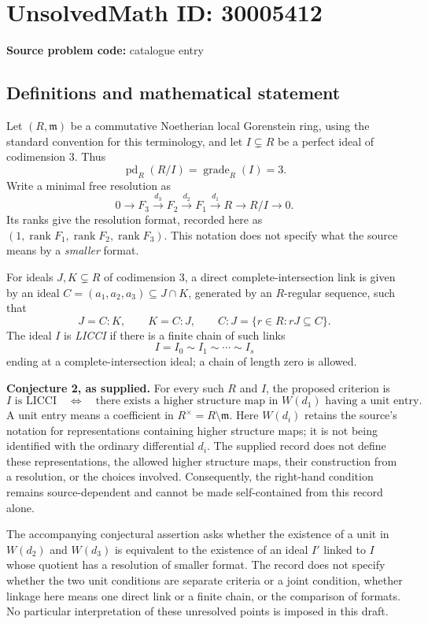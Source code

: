 \documentclass[11pt]{article}
\begin{document}
\section*{UnsolvedMath ID: 30005412}
\textbf{Source problem code:} catalogue entry
\subsection{Definitions and mathematical statement}
Let \((R,\mathfrak m)\) be a commutative Noetherian local Gorenstein ring, using the standard convention for this terminology, and let \(I\subsetneq R\) be a perfect ideal of codimension \(3\). Thus
\[
\operatorname{pd}_R(R/I)=\operatorname{grade}_R(I)=3.
\]
Write a minimal free resolution as
\[
0\longrightarrow F_3\xrightarrow{d_3}F_2\xrightarrow{d_2}F_1\xrightarrow{d_1}R\longrightarrow R/I\longrightarrow0.
\]
Its ranks give the resolution format, recorded here as \((1,\operatorname{rank}F_1,\operatorname{rank}F_2,\operatorname{rank}F_3)\). This notation does not specify what the source means by a \emph{smaller} format.

For ideals \(J,K\subsetneq R\) of codimension \(3\), a direct complete-intersection link is given by an ideal \(C=(a_1,a_2,a_3)\subseteq J\cap K\), generated by an \(R\)-regular sequence, such that
\[
J=C:K,\qquad K=C:J,
\qquad C:J=\{r\in R:rJ\subseteq C\}.
\]
The ideal \(I\) is \emph{LICCI} if there is a finite chain of such links
\[
I=I_0\sim I_1\sim\cdots\sim I_s
\]
ending at a complete-intersection ideal; a chain of length zero is allowed.

\textbf{Conjecture 2, as supplied.} For every such \(R\) and \(I\), the proposed criterion is
\[
I\text{ is LICCI}
\quad\Longleftrightarrow\quad
\text{there exists a higher structure map in }W(d_1)
\text{ having a unit entry}.
\]
A unit entry means a coefficient in \(R^\times=R\setminus\mathfrak m\). Here \(W(d_i)\) retains the source's notation for representations containing higher structure maps; it is not being identified with the ordinary differential \(d_i\). The supplied record does not define these representations, the allowed higher structure maps, their construction from a resolution, or the choices involved. Consequently, the right-hand condition remains source-dependent and cannot be made self-contained from this record alone.

The accompanying conjectural assertion asks whether the existence of a unit in \(W(d_2)\) and \(W(d_3)\) is equivalent to the existence of an ideal \(I'\) linked to \(I\) whose quotient has a resolution of smaller format. The record does not specify whether the two unit conditions are separate criteria or a joint condition, whether linkage here means one direct link or a finite chain, or the comparison of formats. No particular interpretation of these unresolved points is imposed in this draft.
\end{document}
